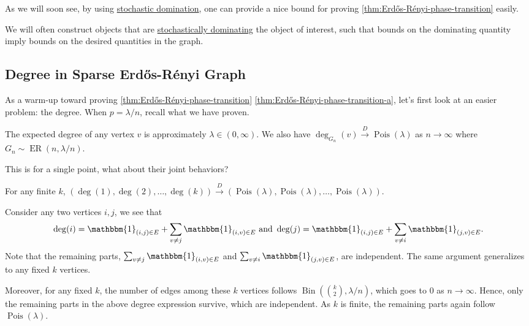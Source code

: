 As we will soon see, by using \hyperref[def:stochastic-domination]{stochastic domination}, one can provide a nice bound for proving \autoref{thm:Erdős-Rényi-phase-transition} easily.

\begin{intuition}
	We will often construct objects that are \hyperref[def:stochastic-domination]{stochastically dominating} the object of interest, such that bounds on the dominating quantity imply bounds on the desired quantities in the graph.
\end{intuition}

\subsection{Degree in Sparse Erdős-Rényi Graph}
As a warm-up toward proving \autoref{thm:Erdős-Rényi-phase-transition} \autoref{thm:Erdős-Rényi-phase-transition-a}, let's first look at an easier problem: the degree. When \(p = \lambda / n\), recall what we have proven.

\begin{prev}
	The expected degree of any vertex \(v\) is approximately \(\lambda \in (0, \infty )\). We also have \(\deg_{G_n}(v) \overset{D}{\to} \operatorname{Pois}(\lambda ) \) as \(n \to \infty \) where \(G_n \sim \operatorname{ER}(n, \lambda / n) \).
\end{prev}

This is for a single point, what about their joint behaviors?

\begin{claim}
	For any finite \(k\), \((\deg(1), \deg(2), \dots , \deg(k)) \overset{D}{\to} (\operatorname{Pois}(\lambda ) , \operatorname{Pois}(\lambda ), \dots , \operatorname{Pois}(\lambda ) )\).
\end{claim}
\begin{explanation}
	Consider any two vertices \(i, j\), we see that
	\[
		\deg(i) = \mathbbm{1}_{(i, j) \in E} + \sum_{v \neq j} \mathbbm{1}_{(i, v) \in E} \text{ and }
		\deg(j) = \mathbbm{1}_{(i, j) \in E} + \sum_{v \neq i} \mathbbm{1}_{(j, v) \in E}.
	\]
	Note that the remaining parts, \(\sum_{v \neq j} \mathbbm{1}_{(i, v) \in E} \) and \(\sum_{v \neq i} \mathbbm{1}_{(j, v) \in E} \), are independent. The same argument generalizes to any fixed \(k\) vertices.

	Moreover, for any fixed \(k\), the number of edges among these \(k\) vertices follows \(\operatorname{Bin}(\binom{k}{2}, \lambda / n) \), which goes to \(0\) as \(n \to \infty \). Hence, only the remaining parts in the above degree expression survive, which are independent. As \(k\) is finite, the remaining parts again follow \(\operatorname{Pois}(\lambda ) \).
\end{explanation}

